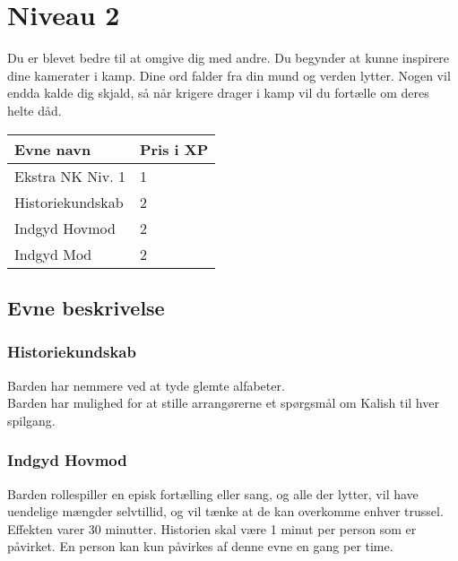 \chapter{Niveau 2}
Du er blevet bedre til at omgive dig med andre. Du begynder at kunne inspirere dine kamerater i kamp. Dine ord falder fra din mund og verden lytter. Nogen vil endda kalde dig skjald, så når krigere drager i kamp vil du fortælle om deres helte dåd.
\begin{table}[H]
    \centering
    \begin{tabular}{|p{}|p{}|}
    \rowcolor{cerulean!80}\hline
    Evne navn & Pris i XP \\\hline
       Ekstra NK Niv. 1 & 1 \\\hline
       Historiekundskab & 2 \\\hline
       Indgyd Hovmod & 2 \\\hline
       Indgyd Mod & 2 \\\hline
    \end{tabular}
\end{table}
\section{Evne beskrivelse}



\subsection{Historiekundskab}
Barden har nemmere ved at tyde glemte alfabeter.\\
Barden har mulighed for at stille arrangørerne et spørgsmål om Kalish til hver spilgang.

\subsection{Indgyd Hovmod}
Barden rollespiller en episk fortælling eller sang, og alle der lytter, vil have uendelige mængder selvtillid, og vil tænke at de kan overkomme enhver trussel. Effekten varer 30 minutter. Historien skal være 1 minut per person som er påvirket. En person kan kun påvirkes af denne evne en gang per time.

